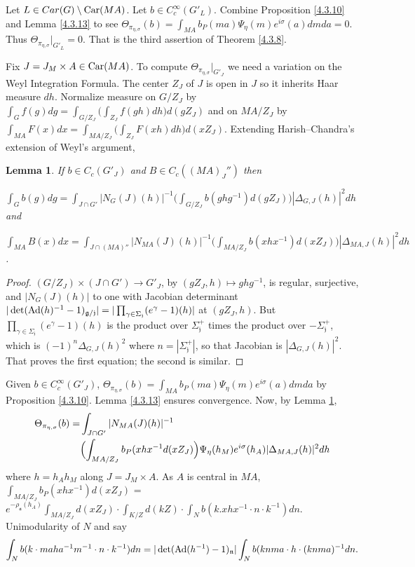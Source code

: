 \documentclass{conm-p-l}
\newtheorem{lemma}[equation]{Lemma}
\renewcommand{\gg}{\mathfrak{g}}
\def\ga{\mathfrak{a}}
\def\gg{\mathfrak{g}}
\def\gj{\mathfrak{j}}
\def\gn{\mathfrak{n}}
\def\Ad{{\rm Ad}}
\def\Car{{\rm Car}}
\begin{document}
Let $L \in Car(G) \setminus \Car(MA)$.  Let
$b \in C^\infty_c(G'_L)$. Combine Proposition \ref{4.3.10} and
Lemma \ref{4.3.13} to see 
$
\Theta_{\pi_{\eta,\sigma}}(b) =
\int_{MA} b_P(ma)\Psi_\eta(m) e^{i\sigma}(a) dmda = 0.
$  
Thus $\Theta_{\pi_{\eta,\sigma}}|_{G'_L} = 0$.  That is the third
assertion of Theorem \ref{4.3.8}.

Fix $J = J_M \times A \in \Car(MA)$.  To compute 
$\Theta_{\pi_{\eta,\sigma}}|_{G'_J}$ we need a variation on the
Weyl Integration Formula.  The center $Z_J$ of $J$ is open in $J$
so it inherits Haar measure $dh$.  Normalize measure on
$G/Z_J$ by $\int_G f(g)dg = \int_{G/Z_J}\bigl ( \int_{Z_J} f(gh)dh
\bigr ) d(gZ_J)$ and on $MA/Z_J$ by
$\int_{MA} F(x)dx = \int_{MA/Z_J}\bigl ( \int_{Z_J} F(xh)dh
\bigr ) d(xZ_J)$.
Extending Harish--Chandra's extension 
\cite{HC1966} of Weyl's argument, 
\begin{lemma}\label{4.3.14} If $b \in C_c(G'_J)$ and
$B \in C_c((MA)_J'')$ then 

\noindent
$\int_G b(g)dg = \int_{J\cap G'} |N_G(J)(h)|^{-1}\bigl (
\int_{G/Z_J} b(ghg^{-1})d(gZ_J)\bigr ) |\Delta_{G,J}(h)|^2 dh$ and

\noindent
$\int_{MA} B(x)dx = \int_{J\cap (MA)''} |N_{MA}(J)(h)|^{-1}\bigl (
\int_{MA/Z_J} b(xhx^{-1})d(xZ_J)\bigr ) |\Delta_{MA,J}(h)|^2 dh$.
\end{lemma}
\begin{proof}
$(G/Z_J) \times (J\cap G')\to G'_J$, by $(gZ_J,h) \mapsto ghg^{-1}$,
is regular, surjective, and $|N_G(J)(h)|$ to one with Jacobian
determinant $|\det(\Ad(h)^{-1}-1)_{\gg/\gj}|
= |\prod_{\gamma \in \Sigma_\gj}(e^\gamma - 1)(h)|$ at
$(gZ_J,h)$.  But $\prod_{\gamma \in \Sigma_\gj}(e^\gamma - 1)(h)$ is
the product over $\Sigma_\gj^+$ times the product over $-\Sigma_\gj^+$,
which is $(-1)^n\Delta_{G,J}(h)^2$ where $n = |\Sigma_\gj^+|$, so that
Jacobian is $|\Delta_{G,J}(h)|^2$.  That proves the first equation;
the second is similar.
\end{proof}

Given $b \in C_c^\infty(G'_J)$, 
$\Theta_{\pi_{\eta,\sigma}}(b) = 
\int_{MA} b_P(ma)\Psi_\eta(m)e^{i\sigma}(a)dmda$
by Proposition \ref{4.3.10}.  Lemma \ref{4.3.13} ensures convergence.
Now, by Lemma \ref{4.3.14},
\begin{equation}\label{4.3.16}
\begin{aligned}
\Theta_{\pi_{\eta,\sigma}}(b) = &\int_{J\cap G'} |N_{MA}(J)(h)|^{-1} \\
&\Bigl ( \int_{MA/Z_J} b_P(xhx^{-1}d(xZ_J)\Bigr ) \Psi_\eta(h_M)
e^{i\sigma}(h_A)|\Delta_{MA,J}(h)|^2dh
\end{aligned}
\end{equation}
where $h = h_Ah_M$ along $J = J_M\times A$.  As $A$ is central in $MA$,
$\int_{MA/Z_J} b_P(xhx^{-1})d(xZ_J)$
= $e^{-\rho_\ga (h_A)}\int_{MA/Z_J}d(xZ_J)\cdot\int_{K/Z}d(kZ)\cdot
\int_N b(k.xhx^{-1}\cdot n\cdot k^{-1})dn.$  Unimodularity of $N$ and
\cite[Lemma 11]{HC1966} say 
$$
\int_N b(k\cdot maha^{-1}m^{-1}\cdot n\cdot k^{-1})dn =       
|\det(\Ad(h^{-1})-1)_\gn|\int_Nb(knma\cdot h\cdot (knma)^{-1}dn.
$$
\end{document}
